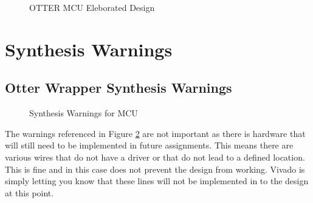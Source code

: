 \documentclass[
    a4paper, %
	12pt, %
    ]{CSSullivanBusinessReport}
\begin{document}
\begin{fullwidth}
\begin{figure}[H]
    \centering
    \captionsetup{style=widetable}
    \caption{OTTER MCU Eleborated Design}
    \label{fig:MCUschematic}
\end{figure}

\section{Synthesis Warnings} %

\subsection{Otter Wrapper Synthesis Warnings} %
\begin{figure}[H]
    \captionsetup{style=widetable}
    \caption{Synthesis Warnings for MCU}
    \label{fig:MCUWarnings}
\end{figure}

The warnings referenced in Figure \ref{fig:MCUWarnings} are not important as there is hardware that will still need to be implemented in future assignments. This means there are various wires that do not have a driver or that do not lead to a defined location. This is fine and in this case does not prevent the design from working. Vivado is simply letting you know that these lines will not be implemented in to the design at this point.


\end{fullwidth}
\end{document}
